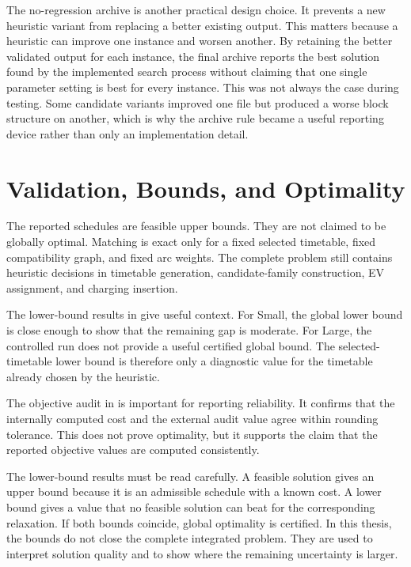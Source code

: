 The no-regression archive is another practical design choice.  It prevents a
new heuristic variant from replacing a better existing output.  This matters
because a heuristic can improve one instance and worsen another.  By retaining
the better validated output for each instance, the final archive reports the
best solution found by the implemented search process without claiming that one
single parameter setting is best for every instance.
This was not always the case during testing.  Some candidate variants improved
one file but produced a worse block structure on another, which is why the
archive rule became a useful reporting device rather than only an
implementation detail.

\section{Validation, Bounds, and Optimality}
\label{sec:discussion-validation-bounds}

The reported schedules are feasible upper bounds.  They are not claimed to be
globally optimal.  Matching is exact only for a fixed selected timetable,
fixed compatibility graph, and fixed arc weights.  The complete problem still
contains heuristic decisions in timetable generation, candidate-family
construction, EV assignment, and charging insertion.

The lower-bound results in  give useful context.
For Small, the global lower bound is close enough to show that the remaining
gap is moderate.  For Large, the controlled run does not provide a useful
certified global bound.  The selected-timetable lower bound is therefore only a
diagnostic value for the timetable already chosen by the heuristic.

The objective audit in  is important for reporting
reliability.  It confirms that the internally computed cost and the external
audit value agree within rounding tolerance.  This does not prove optimality,
but it supports the claim that the reported objective values are computed
consistently.

The lower-bound results must be read carefully.  A feasible solution gives an
upper bound because it is an admissible schedule with a known cost.  A lower
bound gives a value that no feasible solution can beat for the corresponding
relaxation.  If both bounds coincide, global optimality is certified.  In this
thesis, the bounds do not close the complete integrated problem.  They are used
to interpret solution quality and to show where the remaining uncertainty is
larger.

